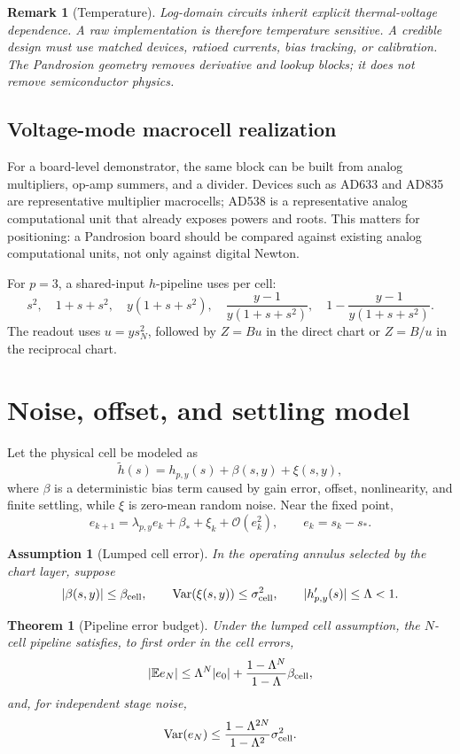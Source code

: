 \documentclass[11pt]{article}
\newtheorem{theorem}[definition]{Theorem}
\newtheorem{remark}[definition]{Remark}
\newtheorem{assumption}[definition]{Assumption}
\newcommand{\hp}{h_{p,y}}
\newcommand{\OO}{\mathcal O}
\DeclareMathOperator{\Var}{Var}
\begin{document}
\begin{remark}[Temperature]
Log-domain circuits inherit explicit thermal-voltage dependence.  A raw
implementation is therefore temperature sensitive.  A credible design must use
matched devices, ratioed currents, bias tracking, or calibration.  The
Pandrosion geometry removes derivative and lookup blocks; it does not remove
semiconductor physics.
\end{remark}

\subsection{Voltage-mode macrocell realization}

For a board-level demonstrator, the same block can be built from analog
multipliers, op-amp summers, and a divider.  Devices such as AD633 and AD835
are representative multiplier macrocells; AD538 is a representative analog
computational unit that already exposes powers and roots.  This matters for
positioning: a Pandrosion board should be compared against existing analog
computational units, not only against digital Newton.

For \(p=3\), a shared-input \(h\)-pipeline uses per cell:
\[
        s^2,\quad 1+s+s^2,\quad y(1+s+s^2),\quad
        \frac{y-1}{y(1+s+s^2)},\quad
        1-\frac{y-1}{y(1+s+s^2)}.
\]
The readout uses \(u=y s_N^2\), followed by \(Z=Bu\) in the direct chart or
\(Z=B/u\) in the reciprocal chart.

\section{Noise, offset, and settling model}

Let the physical cell be modeled as
\[
        \widetilde h(s)=h_{p,y}(s)+\beta(s,y)+\xi(s,y),
\]
where \(\beta\) is a deterministic bias term caused by gain error, offset,
nonlinearity, and finite settling, while \(\xi\) is zero-mean random noise.
Near the fixed point,
\[
        e_{k+1}=\lambda_{p,y}e_k+\beta_*+\xi_k+\OO(e_k^2),
        \qquad e_k=s_k-s_*.
\]

\begin{assumption}[Lumped cell error]
In the operating annulus selected by the chart layer, suppose
\[
        |\beta(s,y)|\le \beta_{\rm cell},
        \qquad
        \Var(\xi(s,y))\le \sigma_{\rm cell}^2,
        \qquad
        |\hp'(s)|\le \Lambda<1.
\]
\end{assumption}

\begin{theorem}[Pipeline error budget]
Under the lumped cell assumption, the \(N\)-cell pipeline satisfies, to first
order in the cell errors,
\[
        |\mathbb E e_N|
        \le
        \Lambda^N|e_0|+\frac{1-\Lambda^N}{1-\Lambda}\beta_{\rm cell},
\]
and, for independent stage noise,
\[
        \Var(e_N)
        \le
        \frac{1-\Lambda^{2N}}{1-\Lambda^2}\sigma_{\rm cell}^2.
\]
\end{theorem}
\end{document}
